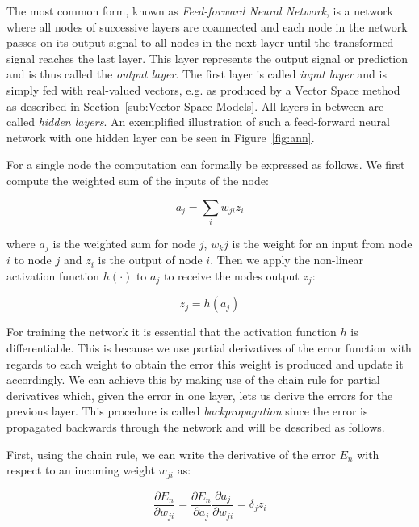 The most common form, known as \emph{Feed-forward Neural Network}, is a network where all nodes of successive layers are coannected and each node in the network passes on its output signal to all nodes in the next layer until the transformed signal reaches the last layer. This layer represents the output signal or prediction and is thus called the \emph{output layer}. The first layer is called \emph{input layer} and is simply fed with real-valued vectors, e.g. as produced by a Vector Space method as described in Section~\ref{sub:Vector Space Models}. All layers in between are called \emph{hidden layers}. An exemplified illustration of such a feed-forward neural network with one hidden layer can be seen in Figure~\ref{fig:ann}.

For a single node the computation can formally be expressed as follows. We first compute the weighted sum of the inputs of the node:

\begin{equation}
  a_j = \sum_i w_{ji} z_i
  \label{eq:ann weighted sum}
\end{equation}

where $a_j$ is the weighted sum for node $j$, $w_kj$ is the weight for an input from node $i$ to node $j$ and $z_i$ is the output of node $i$. Then we apply the non-linear activation function $h(\cdot)$ to $a_j$ to receive the nodes output $z_j$:

\begin{equation}
  z_j = h(a_j)
  \label{eq:ann activation}
\end{equation}

For training the network it is essential that the activation function $h$ is differentiable. This is because we use partial derivatives of the error function with regards to each weight to obtain the error this weight is produced and update it accordingly. We can achieve this by making use of the chain rule for partial derivatives which, given the error in one layer, lets us derive the errors for the previous layer. This procedure is called \emph{backpropagation} since the error is propagated backwards through the network and will be described as follows.

First, using the chain rule, we can write the derivative of the error $E_n$ with respect to an incoming weight $w_{ji}$ as:

\begin{equation}
	\frac{\partial E_n}{\partial w_{ji}} = \frac{\partial E_n}{\partial a_j} \frac{\partial a_j}{\partial w_{ji}} = \delta_j z_i
	\label{eq:ann derivatives}
\end{equation}

